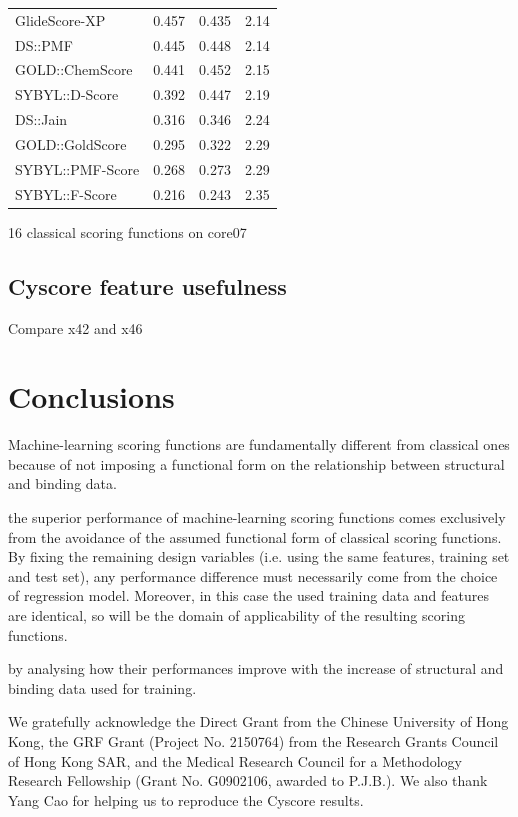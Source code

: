 \documentclass[journal=jacsat,manuscript=article]{achemso}
\begin{document}
\begin{table}
\begin{tabular}{lrrr}
GlideScore-XP & 0.457 & 0.435 & 2.14\\
DS::PMF & 0.445 & 0.448 & 2.14\\
GOLD::ChemScore & 0.441 & 0.452 & 2.15\\
SYBYL::D-Score & 0.392 & 0.447 & 2.19\\
DS::Jain & 0.316 & 0.346 & 2.24\\
GOLD::GoldScore & 0.295 & 0.322 & 2.29\\
SYBYL::PMF-Score & 0.268 & 0.273 & 2.29\\
SYBYL::F-Score & 0.216 & 0.243 & 2.35\\
\hline
\end{tabular}
\end{table}

16 classical scoring functions on core07 \cite{1313}

\subsection{Cyscore feature usefulness}

Compare x42 and x46

\section{Conclusions}

Machine-learning scoring functions are fundamentally different from classical ones because of not imposing a functional form on the relationship between structural and binding data.

the superior performance of machine-learning scoring functions comes exclusively from the avoidance of the assumed functional form of classical scoring functions. By fixing the remaining design variables (i.e. using the same features, training set and test set), any performance difference must necessarily come from the choice of regression model. Moreover, in this case the used training data and features are identical, so will be the domain of applicability of the resulting scoring functions. 

by analysing how their performances improve with the increase of structural and binding data used for training.

\begin{acknowledgement}

We gratefully acknowledge the Direct Grant from the Chinese University of Hong Kong, the GRF Grant (Project No. 2150764) from the Research Grants Council of Hong Kong SAR, and the Medical Research Council for a Methodology Research Fellowship (Grant No. G0902106, awarded to P.J.B.). We also thank Yang Cao for helping us to reproduce the Cyscore results.

\end{acknowledgement}
\end{document}
